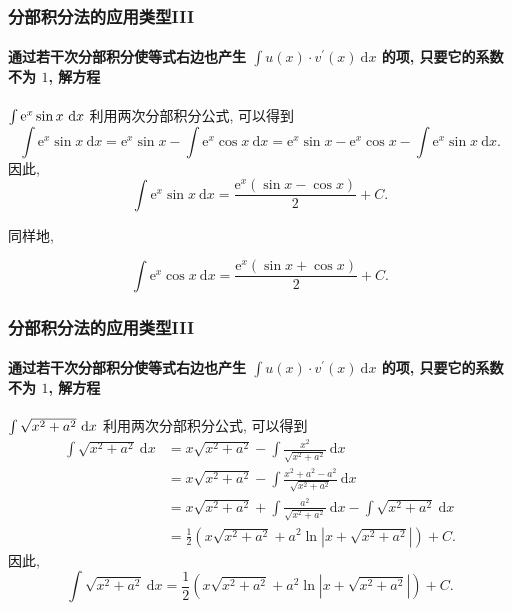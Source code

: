 \documentclass[
10pt,
aspectratio=43,
]{beamer}
\begin{document}
\begin{frame}
	\frametitle{分部积分法的应用类型III}
	\framesubtitle{通过若干次分部积分使等式右边也产生 $\int u(x) \cdot v^{\prime}(x) \mathrm{~d} x$ 的项, 只要它的系数不为 $1$, 解方程}
	\everymath{\displaystyle}
	\begin{exampleblock}{$\color{black}\int \mathrm{e}^x \sin x \mathrm{~d} x$}
		利用两次分部积分公式, 可以得到
		$$
			\int \mathrm{e}^x \sin x \mathrm{~d} x=\mathrm{e}^x \sin x-\int \mathrm{e}^x \cos x \mathrm{~d} x=\mathrm{e}^x \sin x-\mathrm{e}^x \cos x-\int \mathrm{e}^x \sin x \mathrm{~d} x.
		$$
		因此,
		$$
			\int \mathrm{e}^x \sin x \mathrm{~d} x=\frac{\mathrm{e}^x(\sin x-\cos x)}{2}+C.
		$$
	\end{exampleblock}
	同样地,
	\begin{exampleblock}{}
		$$
			\int \mathrm{e}^x \cos x \mathrm{~d} x=\frac{\mathrm{e}^x(\sin x+\cos x)}{2}+C.
		$$
	\end{exampleblock}
\end{frame}

\begin{frame}
	\frametitle{分部积分法的应用类型III}
	\framesubtitle{通过若干次分部积分使等式右边也产生 $\int u(x) \cdot v^{\prime}(x) \mathrm{~d} x$ 的项, 只要它的系数不为 $1$, 解方程}
	\everymath{\displaystyle}
	{\small
		\begin{exampleblock}{$\color{black}\int \sqrt{x^2+a^2} \mathrm{~d} x$}
			利用两次分部积分公式, 可以得到
			$$
				\begin{aligned}
					\int \sqrt{x^2+a^2} \mathrm{~d} x & =x \sqrt{x^2+a^2}-\int \frac{x^2}{\sqrt{x^2+a^2}} \mathrm{~d} x                                   \\
					                                  & =x \sqrt{x^2+a^2}-\int \frac{x^2+a^2-a^2}{\sqrt{x^2+a^2}} \mathrm{~d} x                           \\
					                                  & =x \sqrt{x^2+a^2}+\int \frac{a^2}{\sqrt{x^2+a^2}} \mathrm{~d} x-\int \sqrt{x^2+a^2} \mathrm{~d} x \\
					                                  & =\frac{1}{2}\left(x \sqrt{x^2+a^2}+a^2 \ln \left|x+\sqrt{x^2+a^2}\right|\right)+C.
				\end{aligned}
			$$
			因此,
			$$
				\int \sqrt{x^2+a^2} \mathrm{~d} x=\frac{1}{2}\left(x \sqrt{x^2+a^2}+a^2 \ln \left|x+\sqrt{x^2+a^2}\right|\right)+C.
			$$
		\end{exampleblock}
	}
\end{frame}
\end{document}
